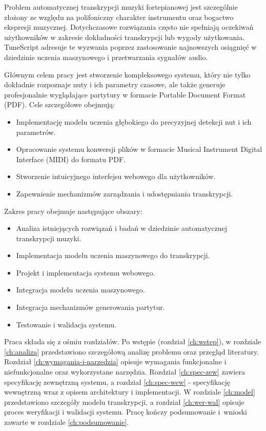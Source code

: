 \documentclass[a4paper,twoside,12pt]{book}
\begin{document}
Problem automatycznej transkrypcji muzyki fortepianowej jest szczególnie złożony ze względu na polifoniczny charakter instrumentu oraz bogactwo ekspresji muzycznej. Dotychczasowe rozwiązania często nie spełniają oczekiwań użytkowników w zakresie dokładności transkrypcji lub wygody użytkowania. TuneScript adresuje te wyzwania poprzez zastosowanie najnowszych osiągnięć w dziedzinie uczenia maszynowego i przetwarzania sygnałów audio.

Głównym celem pracy jest stworzenie kompleksowego systemu, który nie tylko dokładnie rozpoznaje nuty i ich parametry czasowe, ale także generuje profesjonalnie wyglądające partytury w formacie Portable Document Format (PDF). Cele szczegółowe obejmują:

\begin{itemize}
	\item Implementację modelu uczenia głębokiego do precyzyjnej detekcji nut i ich parametrów.
	\item Opracowanie systemu konwersji plików w formacie Musical Instrument Digital Interface (MIDI) do formatu PDF.
	\item Stworzenie intuicyjnego interfejsu webowego dla użytkowników.
	\item Zapewnienie mechanizmów zarządzania i udostępniania transkrypcji.
\end{itemize}

Zakres pracy obejmuje następujące obszary:
\begin{itemize}
	\item Analiza istniejących rozwiązań i badań w dziedzinie automatycznej transkrypcji muzyki.
	\item Implementacja modelu uczenia maszynowego do transkrypcji.
	\item Projekt i implementacja systemu webowego.
	\item Integracja modelu uczenia maszynowego.
	\item Integracja mechanizmów generowania partytur.
	\item Testowanie i walidacja systemu.
\end{itemize}

Praca składa się z ośmiu rozdziałów. Po wstępie (rozdział \ref{ch:wstep}), w rozdziale \ref{ch:analiza} przedstawiono szczegółową analizę problemu oraz przegląd literatury. Rozdział \ref{ch:wymagania-i-narzedzia} opisuje wymagania funkcjonalne i niefunkcjonalne oraz wykorzystane narzędzia. Rozdział \ref{ch:spec-zew} zawiera specyfikację zewnętrzną systemu, a rozdział \ref{ch:spec-wew} - specyfikację wewnętrzną wraz z opisem architektury i implementacji. W rozdziale \ref{ch:model} przedstawiono szczegóły modelu transkrypcji, a rozdział \ref{ch:wer-wal} opisuje proces weryfikacji i walidacji systemu. Pracę kończy podsumowanie i~wnioski zawarte w rozdziale \ref{ch:podsumowanie}.
\end{document}

